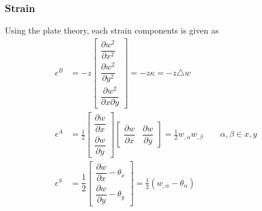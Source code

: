\documentclass[9pt]{beamer}
\begin{document}
\begin{frame}

\frametitle{Strain}
Using the plate theory, each strain components is given as 
\begin{align*}
\epsilon^B & = -z
\begin{bmatrix}
\dfrac{\partial w^2 }{\partial x^2}
\\
\dfrac{\partial w^2 }{\partial y^2}
\\
\dfrac{\partial w^2 }{\partial x \partial y}
\end{bmatrix}
=-z \kappa = -z \mathbf{\triangle} w 
\\
\epsilon^A &
=
\frac{1}{2}
\begin{bmatrix}
\dfrac{\partial w}{\partial x} \\
\dfrac{\partial w}{\partial y}
\end{bmatrix}
\begin{bmatrix}
\dfrac{\partial w}{\partial x} &
\dfrac{\partial w}{\partial y}
\end{bmatrix}
=
\frac{1}{2}
w_{, \alpha}w_{, \beta}  \qquad  \alpha,\beta \in x,y
\\
\epsilon^S & = \dfrac{1}{2}
\begin{bmatrix}
\dfrac{\partial w}{\partial x}-\theta_x 
\\
\dfrac{\partial w}{\partial y}-\theta_y 
\end{bmatrix} 
=
\frac{1}{2} \left( w_{,\alpha}-\theta_{\alpha}  \right)
\end{align*}




\end{frame}
\end{document}
